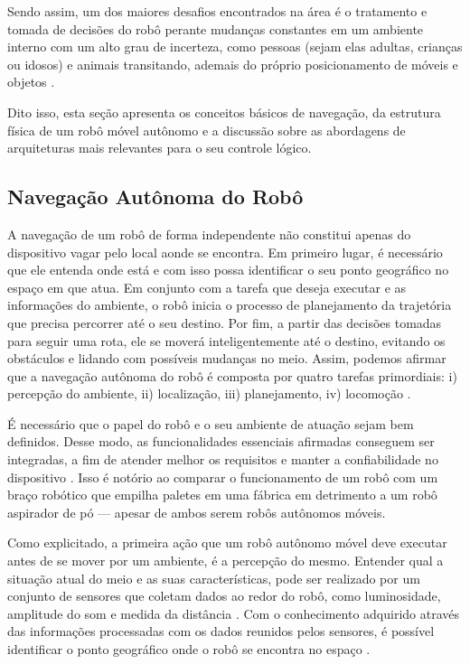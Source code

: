 Sendo assim, um dos maiores desafios encontrados na área é o tratamento e tomada de decisões do robô perante mudanças constantes em um ambiente interno com um alto grau de incerteza, como pessoas (sejam elas adultas, crianças ou idosos) e animais transitando, ademais do próprio  posicionamento de móveis e objetos \cite{practicalIndroductionNehmzow:2012}. 
 
Dito isso, esta seção apresenta os conceitos básicos de navegação, da estrutura física de um robô móvel autônomo e a discussão sobre as abordagens de arquiteturas mais relevantes para o seu controle lógico.


\subsection{Navegação Autônoma do Robô }

A navegação de um robô de forma independente não constitui apenas do dispositivo vagar pelo local aonde se encontra. Em primeiro lugar, é necessário que ele entenda onde está e com isso possa identificar o seu ponto geográfico no espaço em que atua. Em conjunto com a tarefa que deseja executar e as informações do ambiente, o robô inicia o processo de planejamento da trajetória que precisa percorrer até o seu destino. Por fim, a partir das decisões tomadas para seguir uma rota, ele se moverá inteligentemente até o destino, evitando os obstáculos e lidando com possíveis mudanças no meio. Assim, podemos afirmar que a navegação autônoma do robô é composta por quatro tarefas primordiais: i) percepção do ambiente, ii) localização, iii) planejamento, iv) locomoção \cite{mobileRobotsSiegwart:2011}. 

É necessário que o papel do robô e o seu ambiente de atuação sejam bem definidos. Desse modo, as funcionalidades essenciais afirmadas conseguem ser integradas, a fim de atender melhor os requisitos e manter a confiabilidade no dispositivo \cite{mobileRobotsSiegwart:2011}. 
Isso é notório ao comparar o funcionamento de um robô com um braço robótico que empilha paletes em uma fábrica em detrimento a um robô aspirador de pó — apesar de ambos serem robôs autônomos móveis.

Como explicitado, a primeira ação que um robô autônomo móvel deve executar antes de se mover por um ambiente, é a percepção do mesmo. Entender qual a situação atual do meio e as suas características, pode ser realizado por um conjunto de sensores que coletam dados ao redor do robô, como luminosidade, amplitude do som e medida da distância \cite{mobileRobotsSiegwart:2011}. 
Com o conhecimento adquirido através das informações processadas com os dados reunidos pelos sensores, é possível identificar o ponto geográfico onde o robô se encontra no espaço \cite{mobileRobotsSiegwart:2011}.

